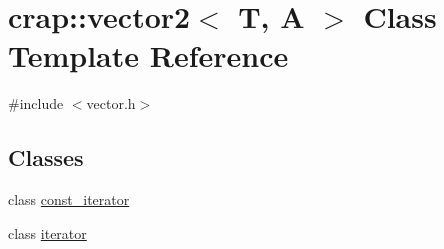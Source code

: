 \hypertarget{classcrap_1_1vector2}{\section{crap\+:\+:vector2$<$ T, A $>$ Class Template Reference}
\label{classcrap_1_1vector2}
}


{\ttfamily \#include $<$vector.\+h$>$}

\subsection*{Classes}
\begin{DoxyCompactItemize}
\item 
class \hyperlink{classcrap_1_1vector2_1_1const__iterator}{const\+\_\+iterator}
\item 
class \hyperlink{classcrap_1_1vector2_1_1iterator}{iterator}
\end{DoxyCompactItemize}
